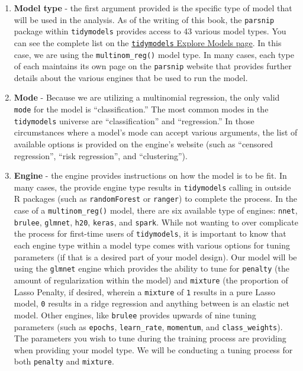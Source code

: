 \documentclass[
  letterpaper,
]{krantz}
\providecommand{\tightlist}{%
  \setlength{\itemsep}{0pt}\setlength{\parskip}{0pt}}\usepackage{longtable,booktabs,array}
\begin{document}
\begin{enumerate}
\def\labelenumi{\arabic{enumi}.}
\tightlist
\item
  \textbf{Model type} - the first argument provided is the specific type
  of model that will be used in the analysis. As of the writing of this
  book, the \texttt{parsnip} package within \texttt{tidymodels} provides
  access to 43 various model types. You can see the complete list on the
  \href{https://www.tidymodels.org/find/parsnip/}{\texttt{tidymodels}
  Explore Models page}. In this case, we are using the
  \texttt{multinom\_reg()} model type. In many cases, each type of each
  maintains its own page on the \texttt{parsnip} website that provides
  further details about the various engines that be used to run the
  model.
\item
  \textbf{Mode} - Because we are utilizing a multinomial regression, the
  only valid \texttt{mode} for the model is ``classification.'' The most
  common modes in the \texttt{tidymodels} universe are
  ``classification'' and ``regression.'' In those circumstances where a
  model's mode can accept various arguments, the list of available
  options is provided on the engine's website (such as ``censored
  regression'', ``risk regression'', and ``clustering'').
\item
  \textbf{Engine} - the engine provides instructions on how the model is
  to be fit. In many cases, the provide engine type results in
  \texttt{tidymodels} calling in outside R packages (such as
  \texttt{randomForest} or \texttt{ranger}) to complete the process. In
  the case of a \texttt{multinom\_reg()} model, there are six available
  type of engines: \texttt{nnet}, \texttt{brulee}, \texttt{glmnet},
  \texttt{h20}, \texttt{keras}, and \texttt{spark}. While not wanting to
  over complicate the process for first-time users of
  \texttt{tidymodels}, it is important to know that each engine type
  within a model type comes with various options for tuning parameters
  (if that is a desired part of your model design). Our model will be
  using the \texttt{glmnet} engine which provides the ability to tune
  for \texttt{penalty} (the amount of regularization within the model)
  and \texttt{mixture} (the proportion of Lasso Penalty, if desired,
  wherein a \texttt{mixture} of \texttt{1} results in a pure Lasso
  model, \texttt{0} results in a ridge regression and anything between
  is an elastic net model. Other engines, like \texttt{brulee} provides
  upwards of nine tuning parameters (such as \texttt{epochs},
  \texttt{learn\_rate}, \texttt{momentum}, and \texttt{class\_weights}).
  The parameters you wish to tune during the training process are
  providing when providing your model type. We will be conducting a
  tuning process for both \texttt{penalty} and \texttt{mixture}.
\end{enumerate}
\end{document}
